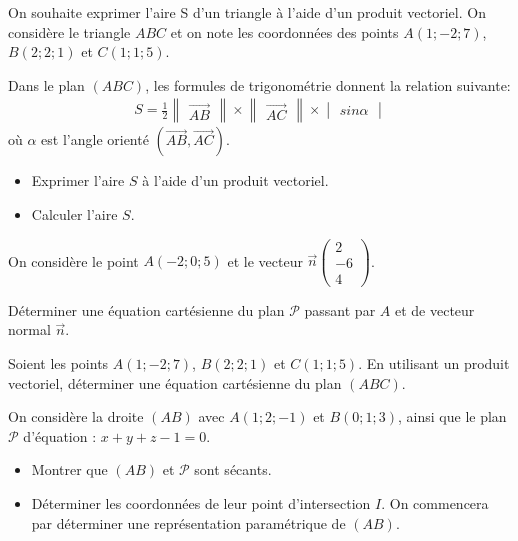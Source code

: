\documentclass[letterpaper,10pt,english]{jupyterBook}
\begin{document}
\sphinxAtStartPar
{} On souhaite exprimer l’aire S d’un triangle à l’aide d’un produit vectoriel. On considère le triangle \(ABC\) et on note les coordonnées des points \(A(1;-2;7)\), \(B(2;2;1)\) et \(C(1;1;5)\).

\sphinxAtStartPar
Dans le plan \((ABC)\), les formules de trigonométrie donnent la relation suivante:
\begin{equation*}
\begin{split}
S=\frac{1}{2}\begin{Vmatrix}\vec{AB}\end{Vmatrix} \times \begin{Vmatrix}\vec{AC}\end{Vmatrix} \times \begin{vmatrix}sin\alpha\end{vmatrix}
\end{split}
\end{equation*}
\sphinxAtStartPar
où \(\alpha\) est l’angle orienté \((\vec{AB},\vec{AC})\).
\begin{itemize}
\item {} 
\sphinxAtStartPar
Exprimer l’aire \(S\) à l’aide d’un produit vectoriel.

\item {} 
\sphinxAtStartPar
Calculer l’aire \(S\).

\end{itemize}

\sphinxAtStartPar
{} On considère le point \(A(-2;0;5)\) et le vecteur \(\vec{n}\begin{pmatrix}
2\\-6\\4
\end{pmatrix}\).

\sphinxAtStartPar
Déterminer une équation cartésienne du plan \(\mathcal{P}\) passant par \(A\) et de vecteur normal \(\vec{n}\).

\sphinxAtStartPar
{} Soient les points \(A(1;-2;7)\), \(B(2;2;1)\) et \(C(1;1;5)\). En utilisant un produit vectoriel, déterminer une équation cartésienne du plan \((ABC)\).

\sphinxAtStartPar
{} On considère la droite \((AB)\) avec \(A(1;2;-1)\) et \(B(0;1;3)\), ainsi que le plan \(\mathcal{P}\) d’équation : \(x+y+z-1=0\).
\begin{itemize}
\item {} 
\sphinxAtStartPar
Montrer que \((AB)\) et \(\mathcal{P}\) sont sécants.

\item {} 
\sphinxAtStartPar
Déterminer les coordonnées de leur point d’intersection \(I\). On commencera par déterminer une représentation paramétrique de \((AB)\).

\end{itemize}
\end{document}
